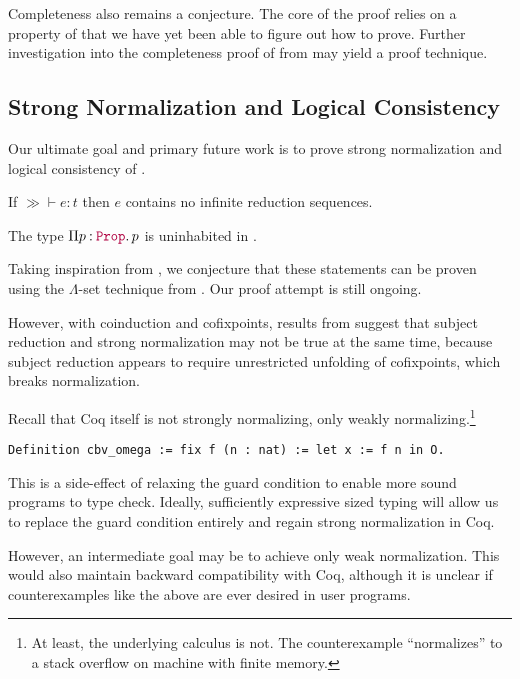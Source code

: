 Completeness also remains a conjecture.
The core of the proof relies on a property of \RecCheckLoop that we have yet been able to figure out how to prove.
Further investigation into the completeness proof of \RecCheck from \Fhat may yield a proof technique.
\fi

\subsection{Strong Normalization and Logical Consistency}

Our ultimate goal and primary future work is to prove strong normalization and logical consistency of \lang.

\begin{conjecture}\label{thm:metatheory:sn}
  If $\gg \vdash e : t$ then $e$ contains no infinite
  reduction sequences.
\end{conjecture}

\begin{conjecture}\label{thm:metatheory:lc}
  The type $\prod{p}{\Prop}{p}$ is uninhabited in \lang.
\end{conjecture}


Taking inspiration from \citet{cic-hat-minus,cc-hat-omega,cic-hat},
we conjecture that these statements can be proven using the
$\Lambda$-set technique from \citet{lambda-set-altenkrich,lambda-set-pts}.
Our proof attempt is still ongoing.

However, with coinduction and cofixpoints, results from \citet{cc-hat-omega}
suggest that subject reduction and strong
normalization may not be true at the same time, because subject
reduction appears to require unrestricted unfolding of cofixpoints,
which breaks normalization.

Recall that Coq itself is not strongly normalizing, only weakly normalizing.\footnote{At least, the underlying calculus is not. The counterexample ``normalizes'' to a stack overflow on machine with finite memory.}

\begin{verbatim}
Definition cbv_omega := fix f (n : nat) := let x := f n in O.
\end{verbatim}

This is a side-effect of relaxing the guard condition to enable more sound programs to type check.
Ideally, sufficiently expressive sized typing will allow us to replace the guard condition entirely and regain strong normalization in Coq.

However, an intermediate goal may be to achieve only weak normalization.
This would also maintain backward compatibility with Coq, although it is unclear if counterexamples like the above are ever desired in user programs.

